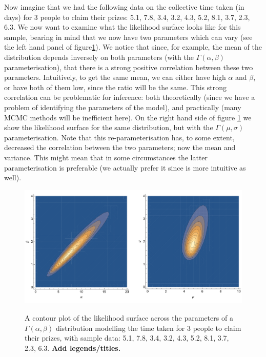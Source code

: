 \documentclass[11pt,fullpage]{book}
\begin{document}
Now imagine that we had the following data on the collective time taken (in days) for 3 people to claim their prizes: {5.1, 7.8, 3.4, 3.2, 4.3, 5.2, 8.1, 3.7, 2.3, 6.3}. We now want to examine what the likelihood surface looks like for this sample, bearing in mind that we now have two parameters which can vary (see the left hand panel of figure\ref{fig:Distributions_gammaLotteryLikelihood}). We notice that since, for example, the mean of the distribution depends inversely on both parameters (with the $\Gamma(\alpha,\beta)$ parameterisation), that there is a strong positive correlation between these two parameters. Intuitively, to get the same mean, we can either have high $\alpha$ and $\beta$, or have both of them low, since the ratio will be the same. This strong correlation can be problematic for inference: both theoretically (since we have a problem of identifying the parameters of the model), and practically (many MCMC methods will be inefficient here). On the right hand side of figure \ref{fig:Distributions_gammaLotteryLikelihood} we show the likelihood surface for the same distribution, but with the $\Gamma(\mu,\sigma)$ parameterisation. Note that this re-parameterisation has, to some extent, decreased the correlation between the two parameters; now the mean and variance. This might mean that in some circumstances the latter parameterisation is preferable (we actually prefer it since is more intuitive as well).

\begin{figure}
\centering
\scalebox{0.3} 
{\includegraphics{Distributions_gammaLotteryLikelihood.pdf}}
\caption{A contour plot of the likelihood surface across the parameters of a $\Gamma(\alpha,\beta)$ distribution modelling the time taken for 3 people to claim their prizes, with sample data: {5.1, 7.8, 3.4, 3.2, 4.3, 5.2, 8.1, 3.7, 2.3, 6.3}. \textbf{Add legends/titles.}}\label{fig:Distributions_gammaLotteryLikelihood}
\end{figure}
\end{document}
